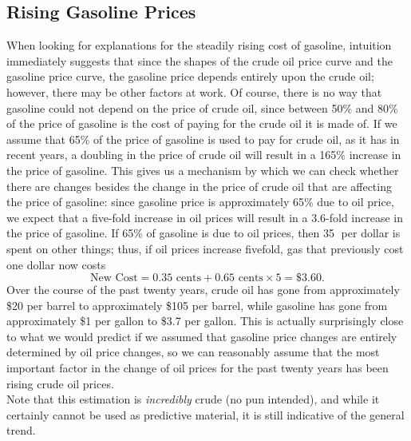 \documentclass[11pt,twocolumn]{article}
\newcommand{\tab}[0] {\hspace*{24pt}}
\begin{document}
\begin{multicols}{2}
\subsection*{Rising Gasoline Prices}
\tab When looking for explanations for the steadily rising cost of gasoline, intuition immediately suggests that since the shapes of the crude oil price curve and the gasoline price curve, the gasoline price depends entirely upon the crude oil; however, there may be other factors at work. Of course, there is no way that gasoline could not depend on the price of crude oil, since between 50\% and 80\% of the price of gasoline is the cost of paying for the crude oil it is made of. If we assume that 65\% of the price of gasoline is used to pay for crude oil, as it has in recent years, a doubling in the price of crude oil will result in a 165\% increase in the price of gasoline. This gives us a mechanism by which we can check whether there are changes besides the change in the price of crude oil that are affecting the price of gasoline: since gasoline price is approximately 65\%  due to oil price, we expect that a five-fold increase in oil prices will result in a 3.6-fold increase in the price of gasoline. If 65\% of gasoline is due to oil prices, then 35$\;$ per dollar is spent on other things; thus, if oil prices increase fivefold, gas that previously cost one dollar now costs
\[\text{New Cost} = 0.35\text{ cents} + 0.65\text{ cents}\times 5 = \$3.60.\]
\tab Over the course of the past twenty years, crude oil has gone from approximately \$20 per barrel to approximately \$105 per barrel, while gasoline has gone from approximately \$1 per gallon to \$3.7 per gallon. This is actually surprisingly close to what we would predict if we assumed that gasoline price changes are entirely determined by oil price changes, so we can reasonably assume that the most important factor in the change of oil prices for the past twenty years has been rising crude oil prices. \\
\tab Note that this estimation is \emph{incredibly} crude (no pun intended), and while it certainly cannot be used as predictive material, it is still indicative of the general trend.

\end{multicols}
\end{document}

